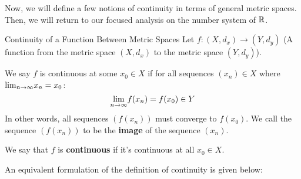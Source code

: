 Now, we will define a few notions of continuity in terms of general metric spaces. Then, we will return to our focused analysis on the number system of \({\mathbb R}\).
\begin{defn}{Continuity of a Function Between Metric Spaces}{}
Let \(f: (X,d_x) \to (Y, d_y)\) (A function from the metric space \((X, d_x)\) to the metric space \((Y, d_y)\)). \newline 

We say \(f\) is continuous at some \(x_0 \in X\) if for all sequences \((x_n) \in X\) where \({\lim_{ n \to \infty}} x_n = x_0\):
\begin{equation*}
 {\lim_{ n \to \infty}} f(x_n) = f(x_0) \in Y 
\end{equation*}
 In other words, all sequences \((f(x_n))\) must converge to \(f(x_0)\). We call the sequence \((f(x_n))\) to be the \textbf{image} of the sequence \((x_n)\).\newline 
 
 We say that \(f\) is \textbf{continuous} if it's continuous at all \(x_0 \in X\).
\end{defn}
An equivalent formulation of the definition of continuity is given below:
